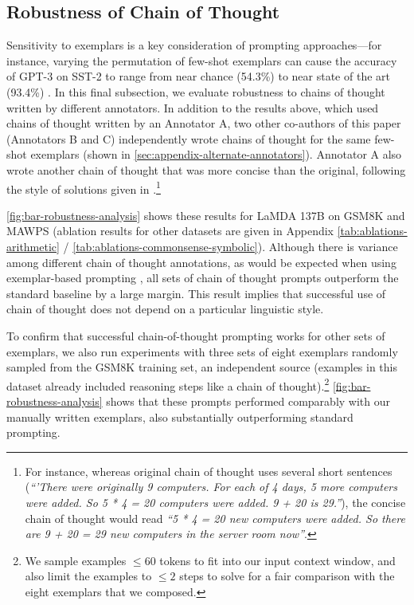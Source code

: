 \documentclass[]{article}
\theoremstyle{plain}
\theoremstyle{definition}
\theoremstyle{remark}
\newcommand{\lamda}[0]{LaMDA}
\begin{document}
\subsection{Robustness of Chain of Thought}\label{subsec:robustness}

Sensitivity to exemplars is a key consideration of prompting approaches---for instance, varying the permutation of few-shot exemplars can cause the accuracy of GPT-3 on SST-2 to range from near chance (54.3\%) to near state of the art (93.4\%) \citep{zhao2021calibrate}.
In this final subsection, we evaluate robustness to chains of thought written by different annotators.
In addition to the results above, which used chains of thought written by an Annotator A, two other co-authors of this paper (Annotators B and C) independently wrote chains of thought for the same few-shot exemplars (shown in \cref{sec:appendix-alternate-annotators}).
Annotator A also wrote another chain of thought that was more concise than the original, following the style of solutions given in \citet{cobbe2021training}.\footnote{For instance, whereas original chain of thought uses several short sentences (\textit{``'There were originally 9 computers. For each of 4 days, 5 more computers were added. So 5 * 4 = 20 computers were added. 9 + 20 is 29.''}), the concise chain of thought would read \textit{``5 * 4 = 20 new computers were added. So there are 9 + 20 = 29 new computers in the server room now''}.}

\cref{fig:bar-robustness-analysis} shows these results for \lamda{} 137B on GSM8K and MAWPS (ablation results for other datasets are given in Appendix \cref{tab:ablations-arithmetic} / \cref{tab:ablations-commonsense-symbolic}).
Although there is variance among different chain of thought annotations, as would be expected when using exemplar-based prompting \citep{le-scao-rush-2021-many,reynolds2021prompt,zhao2021calibrate}, all sets of chain of thought prompts outperform the standard baseline by a large margin. %
This result implies that successful use of chain of thought does not depend on a particular linguistic style.

To confirm that successful chain-of-thought prompting works for other sets of exemplars, we also run experiments with three sets of eight exemplars randomly sampled from the GSM8K training set, an independent source (examples in this dataset already included reasoning steps like a chain of thought).\footnote{We sample examples $\leq 60$ tokens to fit into our input context window, and also limit the examples to $\leq 2$ steps to solve for a fair comparison with the eight exemplars that we composed.}
\cref{fig:bar-robustness-analysis} shows that these prompts performed comparably with our manually written exemplars, also substantially outperforming standard prompting.
\end{document}

